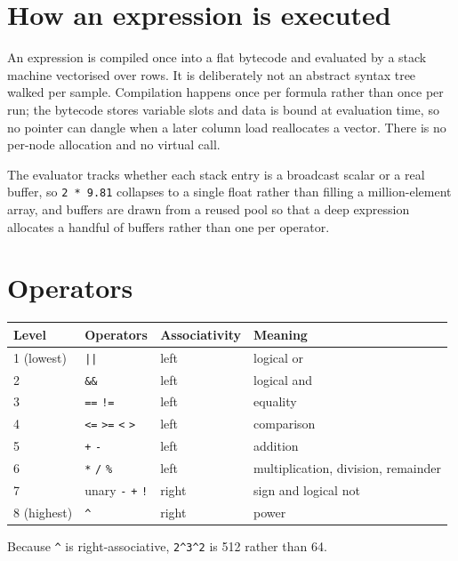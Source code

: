 \documentclass[11pt,a4paper,oneside]{report}
\newcommand{\code}[1]{\texttt{#1}}
\begin{document}
\section{How an expression is executed}

An expression is compiled once into a flat bytecode and evaluated by a stack
machine vectorised over rows. It is deliberately not an abstract syntax tree
walked per sample. Compilation happens once per formula rather than once per run;
the bytecode stores variable slots and data is bound at evaluation time, so no
pointer can dangle when a later column load reallocates a vector. There is no
per-node allocation and no virtual call.

The evaluator tracks whether each stack entry is a broadcast scalar or a real
buffer, so \code{2 * 9.81} collapses to a single float rather than filling a
million-element array, and buffers are drawn from a reused pool so that a deep
expression allocates a handful of buffers rather than one per operator.

\section{Operators}

\begin{center}
\small
\begin{tabular}{@{}llll@{}}
\toprule
\textbf{Level} & \textbf{Operators} & \textbf{Associativity} & \textbf{Meaning} \\
\midrule
1 (lowest) & \code{||} & left & logical or \\
2 & \code{\&\&} & left & logical and \\
3 & \code{==} \code{!=} & left & equality \\
4 & \code{<=} \code{>=} \code{<} \code{>} & left & comparison \\
5 & \code{+} \code{-} & left & addition \\
6 & \code{*} \code{/} \code{\%} & left & multiplication, division, remainder \\
7 & unary \code{-} \code{+} \code{!} & right & sign and logical not \\
8 (highest) & \code{\textasciicircum} & right & power \\
\bottomrule
\end{tabular}
\end{center}

Because \code{\textasciicircum} is right-associative,
\code{2\textasciicircum3\textasciicircum2} is 512 rather than 64.
\end{document}
